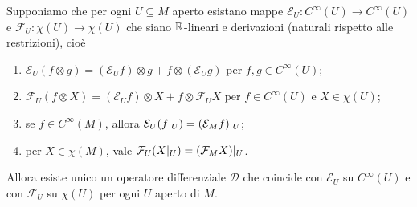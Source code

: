 \begin{theorem} \label{thm:EsistenzaOperatoriDifferenziali}
	Supponiamo che per ogni $U\subseteq M$ aperto esistano mappe $\mathcal E_U : C^\infty(U) \to C^\infty(U)$ e $\mathcal F_U : \chi(U) \to \chi(U)$ che siano $\mathbb R$-lineari e derivazioni (naturali rispetto alle restrizioni), cioè
	\begin{enumerate}
		\item $\mathcal E_U(f\otimes g) = (\mathcal E_U f) \otimes g + f \otimes (\mathcal E_U g)$ per $f,g\in C^\infty(U)$; \label{eod:LeibnitzPerE}
		\item $\mathcal F_U(f\otimes X) = (\mathcal E_U f) \otimes X + f\otimes \mathcal F_U X$ per $f\in C^\infty(U)$ e $X\in\chi(U)$; \label{eod:LeibnitzPerF}
		\item se $f\in C^\infty(M)$, allora $\mathcal E_U(f|_ U) = (\mathcal E_M f)|_ U$; \label{eod:LocalitaPerE}
		\item per $X\in\chi(M)$, vale $\mathcal F_U(X|_ U) = (\mathcal F_M X)|_ U$. \label{eod:LocalitaPerF}
	\end{enumerate}
	Allora esiste unico un operatore differenziale $\mathcal D$ che coincide con $\mathcal E_U$ su $C^\infty(U)$ e con $\mathcal F_U$ su $\chi(U)$ per ogni $U$ aperto di $M$.

\end{theorem}


